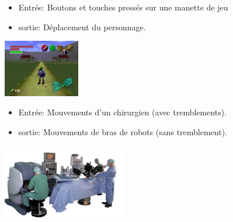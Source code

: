 \begin{myexamples}


	\begin{itemize}
		\item Entrée: Boutons et touches pressés sur une manette de jeu
		\item sortie: Déplacement du personnage.
	\end{itemize}

	\begin{center}
		\includegraphics[trim=0 0 0 0,width=0.25\textwidth]{Images/intro/zelda2.jpg}
	\end{center}
	
	\begin{itemize}
		\item Entrée: Mouvements d'un chirurgien (avec tremblements).
		\item sortie: Mouvements de bras de robots  (sans tremblement).
	\end{itemize}
	\begin{center}
		\includegraphics[trim=0 0 0 20,width=0.4\textwidth]{Images/intro/da-vinci-robot-chirurgien.jpg}
	\end{center}


\end{myexamples}
